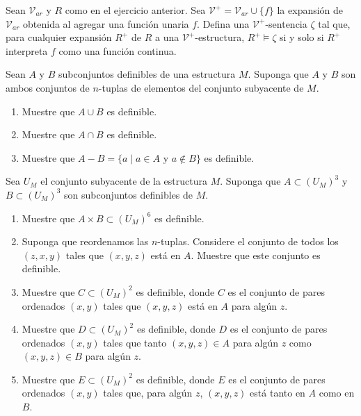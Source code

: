\message{ !name(main.tex)}\documentclass[12pt,a4paper]{book}
\newcommand{\VV}{\mathcal{V}}
\begin{document}
    \begin{ejercicio}
        Sean $\VV_{ar}$ y $R$ como en el ejercicio anterior. Sea $\VV^{+}=\VV_{ar}\cup\{f\}$ la expansión de $\VV_{ar}$
        obtenida al agregar una función unaria $f$. Defina una $\VV^{+}$-sentencia $\zeta$ tal que, para cualquier
        expansión $R^{+}$ de $R$ a una $\VV^{+}$-estructura, $R^{+}\models\zeta$ si y solo si $R^{+}$ interpreta $f$ como
        una función continua.
    \end{ejercicio}

    \begin{ejercicio}
        Sean $A$ y $B$ subconjuntos definibles de una estructura $M$. Suponga que $A$ y $B$ son ambos conjuntos de
        $n$-tuplas de elementos del conjunto subyacente de $M$.
        \begin{enumerate}[label=(\alph*)]
            \item Muestre que $A\cup B$ es definible.
            \item Muestre que $A\cap B$ es definible.
            \item Muestre que $A-B=\{a\mid a\in A\text{ y }a\notin B\}$ es definible.
        \end{enumerate}
    \end{ejercicio}

    \begin{ejercicio}
        Sea $U_{M}$ el conjunto subyacente de la estructura $M$. Suponga que $A\subset(U_{M})^{3}$ y $B\subset(U_{M})^{3}$
        son subconjuntos definibles de $M$.
        \begin{enumerate}[label=(\alph*)]
            \item Muestre que $A\times B\subset(U_{M})^{6}$ es definible.
            \item Suponga que reordenamos las $n$-tuplas. Considere el conjunto de todos los $(z,x,y)$ tales que $(x,y,z)$
            está en $A$. Muestre que este conjunto es definible.
            \item Muestre que $C\subset(U_{M})^{2}$ es definible, donde $C$ es el conjunto de pares ordenados $(x,y)$
            tales que $(x,y,z)$ está en $A$ para algún $z$.
            \item Muestre que $D\subset(U_{M})^{2}$ es definible, donde $D$ es el conjunto de pares ordenados $(x,y)$
            tales que tanto $(x,y,z)\in A$ para algún $z$ como $(x,y,z)\in B$ para algún $z$.
            \item Muestre que $E\subset(U_{M})^{2}$ es definible, donde $E$ es el conjunto de pares ordenados $(x,y)$
            tales que, para algún $z$, $(x,y,z)$ está tanto en $A$ como en $B$.
        \end{enumerate}
    \end{ejercicio}
\end{document}
